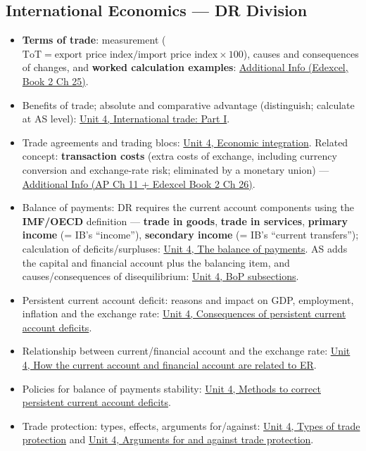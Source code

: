 \documentclass[a4paper,12pt]{article}
\begin{document}
\subsection*{International Economics --- DR Division}
\begin{itemize}
  \item \textbf{Terms of trade}: measurement ($\text{ToT} = \text{export price index}/\text{import price index} \times 100$), causes and consequences of changes, and \textbf{worked calculation examples}: \hyperref[sec:add-tot]{Additional Info (Edexcel, Book 2 Ch 25)}.
  \item Benefits of trade; absolute and comparative advantage (distinguish; calculate at AS level): \hyperref[sec:trade-1]{Unit 4, International trade: Part I}.
  \item Trade agreements and trading blocs: \hyperref[sec:trade-2]{Unit 4, Economic integration}. Related concept: \textbf{transaction costs} (extra costs of exchange, including currency conversion and exchange-rate risk; eliminated by a monetary union) --- \hyperref[sec:add-transaction]{Additional Info (AP Ch 11 + Edexcel Book 2 Ch 26)}.
  \item Balance of payments: DR requires the current account components using the \textbf{IMF/OECD} definition --- \textbf{trade in goods}, \textbf{trade in services}, \textbf{primary income} (= IB's ``income''), \textbf{secondary income} (= IB's ``current transfers''); calculation of deficits/surpluses: \hyperref[sec:exchange-rates]{Unit 4, The balance of payments}. AS adds the capital and financial account plus the balancing item, and causes/consequences of disequilibrium: \hyperref[sec:exchange-rates]{Unit 4, BoP subsections}.
  \item Persistent current account deficit: reasons and impact on GDP, employment, inflation and the exchange rate: \hyperref[sec:further-ER]{Unit 4, Consequences of persistent current account deficits}.
  \item Relationship between current/financial account and the exchange rate: \hyperref[sec:further-ER]{Unit 4, How the current account and financial account are related to ER}.
  \item Policies for balance of payments stability: \hyperref[sec:further-ER]{Unit 4, Methods to correct persistent current account deficits}.
  \item Trade protection: types, effects, arguments for/against: \hyperref[sec:trade-1]{Unit 4, Types of trade protection} and \hyperref[sec:trade-2]{Unit 4, Arguments for and against trade protection}.

\end{itemize}
\end{document}
